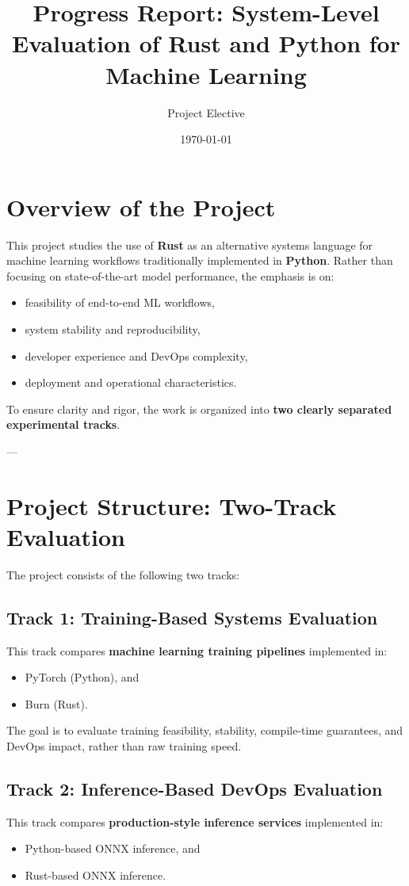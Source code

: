 \documentclass[11pt,a4paper]{article}
\title{\textbf{Progress Report: System-Level Evaluation of Rust and Python for Machine Learning}}
\author{Project Elective}
\date{\today}
\begin{document}
\maketitle

\section{Overview of the Project}

This project studies the use of \textbf{Rust} as an alternative systems language for machine learning workflows traditionally implemented in \textbf{Python}.  
Rather than focusing on state-of-the-art model performance, the emphasis is on:

\begin{itemize}
    \item feasibility of end-to-end ML workflows,
    \item system stability and reproducibility,
    \item developer experience and DevOps complexity,
    \item deployment and operational characteristics.
\end{itemize}

To ensure clarity and rigor, the work is organized into \textbf{two clearly separated experimental tracks}.

---

\section{Project Structure: Two-Track Evaluation}

The project consists of the following two tracks:

\subsection*{Track 1: Training-Based Systems Evaluation}
This track compares \textbf{machine learning training pipelines} implemented in:
\begin{itemize}
    \item PyTorch (Python), and
    \item Burn (Rust).
\end{itemize}

The goal is to evaluate training feasibility, stability, compile-time guarantees, and DevOps impact, rather than raw training speed.

\subsection*{Track 2: Inference-Based DevOps Evaluation}
This track compares \textbf{production-style inference services} implemented in:
\begin{itemize}
    \item Python-based ONNX inference, and
    \item Rust-based ONNX inference.
\end{itemize}
\end{document}
